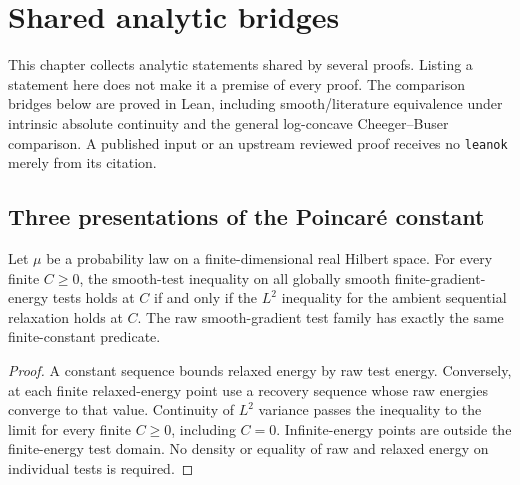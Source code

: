 \chapter{Shared analytic bridges}
\label{chap:shared-analytic-bridges}

This chapter collects analytic statements shared by several proofs.  Listing a statement here
does not make it a premise of every proof.
The comparison bridges below are proved in Lean, including smooth/literature
equivalence under intrinsic absolute continuity and the general log-concave Cheeger--Buser
comparison.
A published input or an upstream reviewed proof receives no \texttt{leanok} merely from its citation.

\section{Three presentations of the Poincar\'e constant}

\begin{theorem}
  \label{thm:legacy-relaxed-holds-equivalence}
  \leanok
  Let $\mu$ be a probability law on a finite-dimensional real Hilbert space.  For every finite
  $C\ge0$, the smooth-test inequality on all globally smooth finite-gradient-energy tests holds at $C$
  if and only if the $L^2$ inequality for the ambient sequential relaxation holds at $C$.
  The raw smooth-gradient test family has exactly the same finite-constant predicate.
\end{theorem}
\begin{proof}
  \leanok
  A constant sequence bounds relaxed energy by raw test energy. Conversely, at each
  finite relaxed-energy point use a recovery sequence whose raw energies converge to that value.
  Continuity of $L^2$ variance passes the inequality to the limit for every finite $C\ge0$,
  including $C=0$. Infinite-energy points are outside the finite-energy test domain. No density
  or equality of raw and relaxed energy on individual tests is required.
\end{proof}

